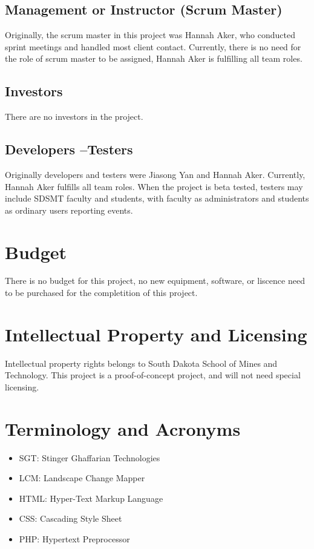 \subsection{Management or Instructor (Scrum Master)}
Originally, the scrum master in this project was Hannah Aker, who conducted sprint meetings and handled most client contact. Currently, there is no need for the role of scrum master to be assigned, Hannah Aker is fulfilling all team roles.

\subsection{Investors}
There are no investors in the project.


\subsection{Developers --Testers}
Originally developers and testers were Jiasong Yan and Hannah Aker. Currently, Hannah Aker fulfills all team roles. When the project is beta tested, testers may include SDSMT faculty and students, with faculty as administrators and students as ordinary users reporting events.

\section{Budget}
There is no budget for this project, no new equipment, software, or liscence need to be purchased for the completition of this project.

\section{Intellectual Property and Licensing}
Intellectual property rights belongs to South Dakota School of Mines and Technology. This project is a proof-of-concept project, and will not need special licensing.

\section{Terminology and Acronyms}
\begin{itemize}
\itemsep0em
\item SGT: Stinger Ghaffarian Technologies
\item LCM: Landscape Change Mapper
\item HTML: Hyper-Text Markup Language
\item CSS: Cascading Style Sheet
\item PHP: Hypertext Preprocessor
\end{itemize}

